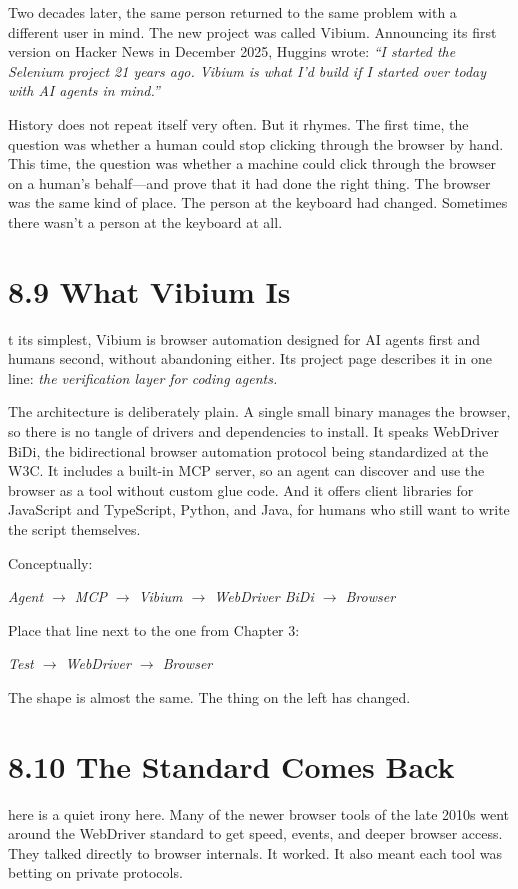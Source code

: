 \documentclass[11pt, a4paper, openany]{book}
\newcommand{\initialcap}[1]{{\fontfamily{lmss}\selectfont\huge\textbf{#1}}}
\begin{document}
Two decades later, the same person returned to the same problem with a different user in mind. The new project was called Vibium. Announcing its first version on Hacker News in December 2025, Huggins wrote: \textit{``I started the Selenium project 21 years ago. Vibium is what I'd build if I started over today with AI agents in mind.''}

History does not repeat itself very often. But it rhymes. The first time, the question was whether a human could stop clicking through the browser by hand. This time, the question was whether a machine could click through the browser on a human's behalf---and prove that it had done the right thing. The browser was the same kind of place. The person at the keyboard had changed. Sometimes there wasn't a person at the keyboard at all.

\section{8.9 What Vibium Is}
\noindent \initialcap{A}t its simplest, Vibium is browser automation designed for AI agents first and humans second, without abandoning either. Its project page describes it in one line: \textit{the verification layer for coding agents.}

The architecture is deliberately plain. A single small binary manages the browser, so there is no tangle of drivers and dependencies to install. It speaks WebDriver BiDi, the bidirectional browser automation protocol being standardized at the W3C. It includes a built-in MCP server, so an agent can discover and use the browser as a tool without custom glue code. And it offers client libraries for JavaScript and TypeScript, Python, and Java, for humans who still want to write the script themselves.

Conceptually:
\begin{center}
\textit{Agent $\rightarrow$ MCP $\rightarrow$ Vibium $\rightarrow$ WebDriver BiDi $\rightarrow$ Browser}
\end{center}
Place that line next to the one from Chapter 3:
\begin{center}
\textit{Test $\rightarrow$ WebDriver $\rightarrow$ Browser}
\end{center}
The shape is almost the same. The thing on the left has changed.

\section{8.10 The Standard Comes Back}
\noindent \initialcap{T}here is a quiet irony here. Many of the newer browser tools of the late 2010s went around the WebDriver standard to get speed, events, and deeper browser access. They talked directly to browser internals. It worked. It also meant each tool was betting on private protocols.
\end{document}
